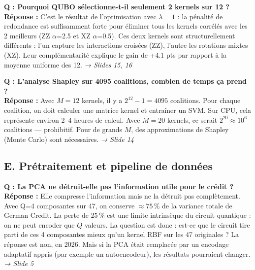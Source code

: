 \documentclass[12pt, a4paper]{article}
\begin{document}
\begin{question}
\textbf{Q : Pourquoi QUBO sélectionne-t-il seulement 2 kernels sur 12 ?}\\[4pt]
\textbf{Réponse :} C'est le résultat de l'optimisation avec $\lambda=1$ :
la pénalité de redondance est suffisamment forte pour éliminer tous les kernels corrélés
avec les 2 meilleurs (ZZ $\alpha$=2.5 et XZ $\alpha$=0.5).
Ces deux kernels sont structurellement différents : l'un capture les interactions croisées (ZZ),
l'autre les rotations mixtes (XZ). Leur complémentarité explique le gain de +4.1 pts
par rapport à la moyenne uniforme des 12.
\hfill\textit{→ Slides 15, 16}
\end{question}

\begin{question}
\textbf{Q : L'analyse Shapley sur 4095 coalitions, combien de temps ça prend ?}\\[4pt]
\textbf{Réponse :} Avec $M=12$ kernels, il y a $2^{12}-1 = 4095$ coalitions.
Pour chaque coalition, on doit calculer une matrice kernel et entraîner un SVM.
Sur CPU, cela représente environ 2--4 heures de calcul.
Avec $M=20$ kernels, ce serait $2^{20} \approx 10^6$ coalitions — prohibitif.
Pour de grands $M$, des approximations de Shapley (Monte Carlo) sont nécessaires.
\hfill\textit{→ Slide 14}
\end{question}

\subsection*{E. Prétraitement et pipeline de données}

\begin{question}
\textbf{Q : La PCA ne détruit-elle pas l'information utile pour le crédit ?}\\[4pt]
\textbf{Réponse :} Elle compresse l'information mais ne la détruit pas complètement.
Avec Q=4 composantes sur 47, on conserve $\approx 75\,\%$ de la variance totale
de German Credit. La perte de 25\,\% est une limite intrinsèque du circuit quantique :
on ne peut encoder que $Q$ valeurs. La question est donc : est-ce que le circuit
tire parti de ces 4 composantes mieux qu'un kernel RBF sur les 47 originales ?
La réponse est non, en 2026. Mais si la PCA était remplacée par un encodage adaptatif
appris (par exemple un autoencodeur), les résultats pourraient changer.
\hfill\textit{→ Slide 5}
\end{question}
\end{document}
